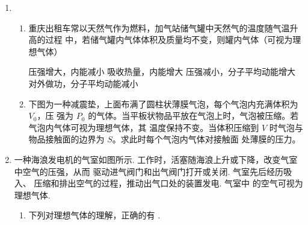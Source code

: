 \begin{enumerate}
\begin{enumerate}
\end{enumerate}

\item 
{}
\begin{enumerate}
	\item
重庆出租车常以天然气作为燃料，加气站储气罐中天然气的温度随气温升高的过程
中，若储气罐内气体体积及质量均不变，则罐内气体（可视为理想气体）  

\fourchoices
{压强增大，内能减小}
{吸收热量，内能增大}
{压强减小，分子平均动能增大}
{对外做功，分子平均动能减小}



\item 
下图为一种减震垫，上面布满了圆柱状薄膜气泡，每个气泡内充满体积为 $ V_{0} $，压
强为 $ P_{0} $ 的气体。当平板状物品平放在气泡上时，气泡被压缩。若气泡内气体可视为理想气体，其
温度保持不变。当体积压缩到 $ V $ 时气泡与物品接触面的边界为 $ S $。求此时每个气泡内气体对接触面
处薄膜的压力。
\begin{figure}[h!]
	\centering
	
\end{figure}


	
\end{enumerate}


\item 
{}
一种海浪发电机的气室如图所示. 工作时，活塞随海浪上升或下降，改变气室中空气的压强，从而
驱动进气阀门和出气阀门打开或关闭. 气室先后经历吸入、
压缩和排出空气的过程，推动出气口处的装置发电. 气室中
的空气可视为理想气体.
\begin{enumerate}
	\item
 下列对理想气体的理解，正确的有 \underlinegap .
 \begin{figure}[h!]
 	\centering
 	
 \end{figure}
 

\end{enumerate}
\end{enumerate}
